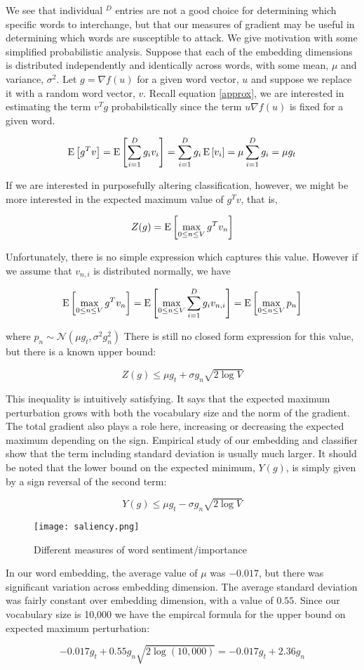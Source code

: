 We see that individual $^{D}$ entries are not a good choice for determining which specific words to interchange, but that our measures of gradient may be useful in determining which words are susceptible to attack.  We give motivation with some simplified probabilistic analysis.  Suppose that each of the embedding dimensions is distributed independently and identically across words, with some mean, $\mu$ and variance, $\sigma^2$.  Let $g = \nabla f(u)$ for a given word vector, $u$ and suppose we replace it with a random word vector, $v$.  Recall equation \ref{approx}, we are interested in estimating the term $v^Tg$ probabilstically since the term $u\nabla f(u)$ is fixed for a given word.

$$\E{g^Tv} = \E{\sum_{i=1}^D{g_iv_i}} = \sum_{i=1}^D{g_i\E{v_i}} = \mu\sum_{i=1}^D{g_i} = \mu g_t$$

\noindent
If we are interested in purposefully altering classification, however, we might be more interested in the expected maximum value of $g^Tv$, that is,

$$Z(g) = \E{\underset{0\leq n\leq V}{\max}\,{g^Tv_n}}$$

\noindent
Unfortunately, there is no simple expression which captures this value.  However if we assume that $v_{n,i}$ is distributed normally, we have 

$$\E{\underset{0\leq n\leq V}{\max}\,{g^Tv_n}} = \E{\underset{0\leq n\leq V}{\max}\,{\sum_{i=1}^D{g_i}v_{n,i}}} = \E{\underset{0\leq n\leq V}{\max}\,{p_n}}$$

\noindent
where $p_n \sim \mathcal{N}(\mu g_t,\sigma^2 g_n^2)$  There is still no closed form expression for this value, but there is a known upper bound:

$$Z(g) \leq \mu g_t + \sigma g_n\sqrt{2\log{V}}$$

\noindent
This inequality is intuitively satisfying.  It says that the expected maximum perturbation grows with both the vocabulary size and the norm of the gradient.  The total gradient also plays a role here, increasing or decreasing the expected maximum depending on the sign.  Empirical study of our embedding and classifier show that the term including standard deviation is usually much larger.  It should be noted that the lower bound on the expected minimum, $Y(g)$, is simply given by a sign reversal of the second term:

$$Y(g) \leq \mu g_t - \sigma g_n\sqrt{2\log{V}}$$

\begin{figure}
    \centering
    \texttt{[image: saliency.png]}
    \caption{Different measures of word sentiment/importance}
    \label{fig:saliency}
\end{figure}

In our word embedding, the average value of $\mu$ was $-0.017$, but there was significant variation across embedding dimension.  The average standard deviation was fairly constant over embedding dimension, with a value of $0.55$.  Since our vocabulary size is 10,000 we have the empircal formula for the upper bound on expected maximum perturbation:

$$ -0.017g_t + 0.55g_n\sqrt{2\log(10,000)} = -0.017g_t + 2.36g_n$$
